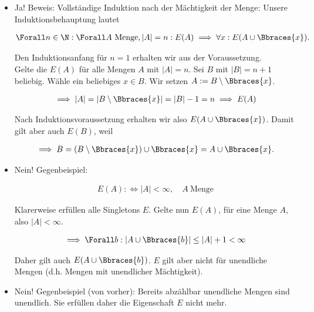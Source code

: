 \begin{solution}

  \phantom{}

  \begin{itemize}

    \item Ja!
    Beweis:
    Vollständige Induktion nach der Mächtigkeit der Menge:
    Unsere Induktionsbehauptung lautet

    \begin{align*}
      \Forall n \in \N:
      \Forall A ~\text{Menge}, |A| = n:
      E(A) \implies \forall x: E(A \cup \Bbraces{x}).
    \end{align*}
    
    Den Induktionsanfang für $n = 1$ erhalten wir aus der Voraussetzung. \\
    Gelte die $E(A)$ für alle Mengen $A$ mit $|A| = n$.
    Sei $B$ mit $|B| = n + 1$ beliebig.
    Wähle ein beliebiges $x \in B$.
    Wir setzen $A := B \setminus \Bbraces{x}$.

    \begin{align*}
      \implies
      |A| = |B \setminus \Bbraces{x}| = |B| - 1 = n
      \implies
      E(A)
    \end{align*}

    Nach Induktionsvoraussetzung erhalten wir also $E(A \cup \Bbraces{x})$.
    Damit gilt aber auch $E(B)$, weil

    \begin{align*}
      \implies
      B = (B \setminus \Bbraces{x}) \cup \Bbraces{x}
      =
      A \cup \Bbraces{x}.
    \end{align*}
  
    \item Nein!
    Gegenbeispiel:

    \begin{align*}
      E(A) :\iff |A| < \infty,
      \quad
      A ~\text{Menge}
    \end{align*}

    Klarerweise erfüllen alle Singletons $E$.
    Gelte nun $E(A)$, für eine Menge $A$, also $|A| < \infty$.

    \begin{align*}
      \implies
      \Forall b:
      |A \cup \Bbraces{b}| \leq |A| + 1 < \infty
    \end{align*}
    
    Daher gilt auch $E(A \cup \Bbraces{b})$.
    $E$ gilt aber nicht für unendliche Mengen (d.h. Mengen mit unendlicher Mächtigkeit).

    \item Nein!
    Gegenbeispiel (von vorher):
    Bereits abzählbar unendliche Mengen sind unendlich.  
    Sie erfüllen daher die Eigenschaft $E$ nicht mehr.

  \end{itemize}

\end{solution}


